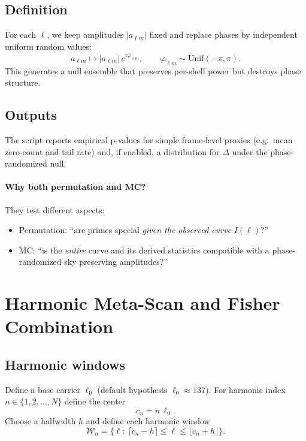 \documentclass[11pt,a4paper]{article}
\begin{document}
\subsection{Definition}
For each $\ell$, we keep amplitudes $|a_{\ell m}|$ fixed and replace phases by
independent uniform random values:
\begin{equation}
a_{\ell m} \mapsto |a_{\ell m}|\,e^{i\varphi_{\ell m}},\qquad
\varphi_{\ell m}\sim \mathrm{Unif}(-\pi,\pi).
\end{equation}
This generates a null ensemble that preserves per-shell power but destroys phase structure.

\subsection{Outputs}
The script reports empirical p-values for simple frame-level proxies (e.g.\ mean
zero-count and tail rate) and, if enabled, a distribution for $\Delta$ under the
phase-randomized null.

\paragraph{Why both permutation and MC?}
They test different aspects:
\begin{itemize}
\item Permutation: ``are primes special \emph{given the observed curve} $I(\ell)$?''
\item MC: ``is the \emph{entire} curve and its derived statistics compatible with a
phase-randomized sky preserving amplitudes?''
\end{itemize}

\section{Harmonic Meta-Scan and Fisher Combination}

\subsection{Harmonic windows}
Define a base carrier $\ell_0$ (default hypothesis $\ell_0\approx 137$).
For harmonic index $n\in\{1,2,\dots,N\}$ define the center
\begin{equation}
c_n = n\,\ell_0.
\end{equation}
Choose a halfwidth $h$ and define each harmonic window
\begin{equation}
\mathcal{W}_n = \{\ell:\ \lceil c_n-h\rceil \le \ell \le \lfloor c_n+h\rfloor\}.
\end{equation}
\end{document}

